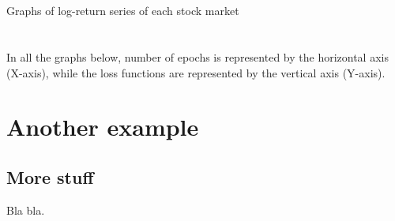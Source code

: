 \documentclass[a4paper,11pt,oneside]{book}
\begin{document}
\begin{appendix}
		\chapter{}
	
	Graphs of log-return series of each stock market	
	


	\chapter{}

	
In all the graphs below, number of epochs is represented by the
horizontal axis (X-axis), while the loss functions are represented by the vertical axis
(Y-axis).



	
	
	






	
	\chapter{Another example}
	\label{app_ex2}
	
	
	\section{More stuff}
	
	Bla bla.
	
\end{appendix}


%



\listoffigures
\listoftables


\end{document}
